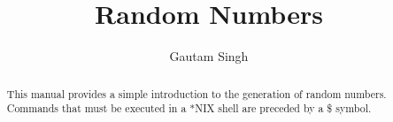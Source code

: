 \documentclass[journal,12pt,twocolumn]{IEEEtran}
\renewcommand\thesection{\arabic{section}}
\begin{document}
\let\StandardTheFigure\thefigure
\renewcommand{\thefigure}{\thesection}



\makeatletter
{}
\makeatother

\let\StandardTheFigure\thefigure
\let\StandardTheTable\thetable
\let\vec\mathbf
{}

\vspace{3cm}


\title{%
	Random Numbers
}

%
%
%

\author{Gautam Singh}
\maketitle

\tableofcontents

\bigskip

\renewcommand{\thefigure}{\theenumi}
\renewcommand{\thetable}{\theenumi}

\begin{abstract}
	This manual provides a simple introduction to the generation of random numbers. Commands that must be executed in a *NIX shell are preceded by a \$ symbol.
\end{abstract}
\end{document}

